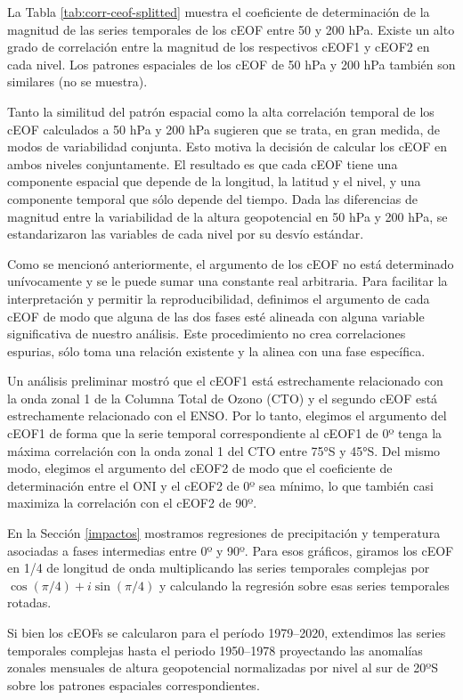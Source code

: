 \documentclass[12pt,oneside]{reedthesis}
\begin{document}
La Tabla \ref{tab:corr-ceof-splitted} muestra el coeficiente de determinación de la magnitud de las series temporales de los cEOF entre 50 y 200 hPa.
Existe un alto grado de correlación entre la magnitud de los respectivos cEOF1 y cEOF2 en cada nivel.
Los patrones espaciales de los cEOF de 50 hPa y 200 hPa también son similares (no se muestra).

Tanto la similitud del patrón espacial como la alta correlación temporal de los cEOF calculados a 50 hPa y 200 hPa sugieren que se trata, en gran medida, de modos de variabilidad conjunta.
Esto motiva la decisión de calcular los cEOF en ambos niveles conjuntamente.
El resultado es que cada cEOF tiene una componente espacial que depende de la longitud, la latitud y el nivel, y una componente temporal que sólo depende del tiempo.
Dada las diferencias de magnitud entre la variabilidad de la altura geopotencial en 50 hPa y 200 hPa, se estandarizaron las variables de cada nivel por su desvío estándar.

Como se mencionó anteriormente, el argumento de los cEOF no está determinado unívocamente y se le puede sumar una constante real arbitraria.
Para facilitar la interpretación y permitir la reproducibilidad, definimos el argumento de cada cEOF de modo que alguna de las dos fases esté alineada con alguna variable significativa de nuestro análisis.
Este procedimiento no crea correlaciones espurias, sólo toma una relación existente y la alinea con una fase específica.

Un análisis preliminar mostró que el cEOF1 está estrechamente relacionado con la onda zonal 1 de la Columna Total de Ozono (CTO) y el segundo cEOF está estrechamente relacionado con el ENSO.
Por lo tanto, elegimos el argumento del cEOF1 de forma que la serie temporal correspondiente al cEOF1 de 0º tenga la máxima correlación con la onda zonal 1 del CTO entre 75°S y 45°S.
Del mismo modo, elegimos el argumento del cEOF2 de modo que el coeficiente de determinación entre el ONI y el cEOF2 de 0º sea mínimo, lo que también casi maximiza la correlación con el cEOF2 de 90º.

En la Sección \ref{impactos} mostramos regresiones de precipitación y temperatura asociadas a fases intermedias entre 0º y 90º.
Para esos gráficos, giramos los cEOF en 1/4 de longitud de onda multiplicando las series temporales complejas por \(\cos(\pi/4) + i\sin(\pi/4)\) y calculando la regresión sobre esas series temporales rotadas.

Si bien los cEOFs se calcularon para el período 1979--2020, extendimos las series temporales complejas hasta el periodo 1950--1978 proyectando las anomalías zonales mensuales de altura geopotencial normalizadas por nivel al sur de 20ºS sobre los patrones espaciales correspondientes.
\end{document}
